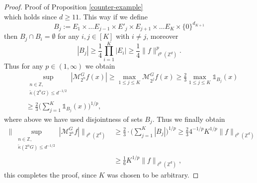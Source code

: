 \documentclass[a4paper,oneside, reqno]{amsart}
\numberwithin{equation}{section}
\theoremstyle{definition}%
\theoremstyle{definition}
\theoremstyle{definition}%
\theoremstyle{definition}
\newcommand{\Z}{\mathbb{Z}}
\begin{document}
\begin{proof}{Proof of Proposition \ref{counter-example}}
\[\]
which holds since $d \ge 11$.
This way if we define
\[
B_j:=E_1 \times \ldots E_{j-1} \times E'_j \times E_{j+1} \times \ldots E_{K} \times \{0\}^{d_{K+1}}
\]
then $B_j \cap B_{i} = \emptyset$ for any $i,j \in [K]$ with $i \neq j$, moreover 
\[
|B_j| \ge \frac{1}{4} \prod_{i=1}^K |E_i| \ge \frac{1}{4} \|f \|_{\ell^p(\Z^d)}^p.
\]
Thus for any $p \in (1, \infty)$ we obtain
\begin{align*}
    & \sup_{\substack{n \in \Z, \\ \widetilde{\kappa}(2^n G) \le d^{-1/2}}} |\mathcal{M}_{2^n}^G f(x)|  \ge \max_{1 \le j \le K} \mathcal{M}_{2^j}^G f(x) \ge \frac{2}{3} \max_{1 \le j \le K} \mathds{1}_{B_j}(x) \\
    &\ge \frac{2}{3} \bigg( \sum_{j=1}^K \mathds{1}_{B_j}(x) \bigg)^{1/p},
\end{align*}
where above we have used disjointness of sets $B_j$. Thus we finally obtain
\begin{align*}
    \bigg\|\sup_{\substack{n \in \Z, \\ \widetilde{\kappa}(2^n G) \le d^{-1/2}}} |\mathcal{M}_{2^n}^G f| \bigg\|_{\ell^p(\Z^d)} &\ge \frac{2}{3} \cdot \bigg( \sum_{j=1}^K |B_j| \bigg)^{1/p} \ge \frac{2}{3} 4^{-1/p} K^{1/p} \|f \|_{\ell^p (\Z^d)}\\
    &\ge \frac{1}{6}K^{1/p} \|f \|_{\ell^p (\Z^d)},
\end{align*}
this completes the proof, since $K$ was chosen to be arbitrary.
\end{proof}
\end{document}
